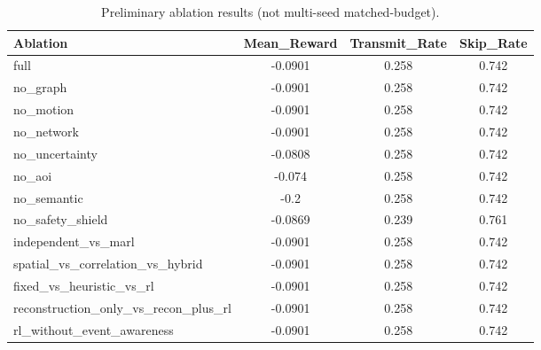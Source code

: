\begin{table}[t]
\centering
\caption{Preliminary ablation results (not multi-seed matched-budget).}
\label{tab:ablation}
\begin{tabular}{lccc}
\toprule
Ablation & Mean\_Reward & Transmit\_Rate & Skip\_Rate \\
\midrule
full & -0.0901 & 0.258 & 0.742 \\
no\_graph & -0.0901 & 0.258 & 0.742 \\
no\_motion & -0.0901 & 0.258 & 0.742 \\
no\_network & -0.0901 & 0.258 & 0.742 \\
no\_uncertainty & -0.0808 & 0.258 & 0.742 \\
no\_aoi & -0.074 & 0.258 & 0.742 \\
no\_semantic & -0.2 & 0.258 & 0.742 \\
no\_safety\_shield & -0.0869 & 0.239 & 0.761 \\
independent\_vs\_marl & -0.0901 & 0.258 & 0.742 \\
spatial\_vs\_correlation\_vs\_hybrid & -0.0901 & 0.258 & 0.742 \\
fixed\_vs\_heuristic\_vs\_rl & -0.0901 & 0.258 & 0.742 \\
reconstruction\_only\_vs\_recon\_plus\_rl & -0.0901 & 0.258 & 0.742 \\
rl\_without\_event\_awareness & -0.0901 & 0.258 & 0.742 \\
\bottomrule
\end{tabular}
\end{table}
